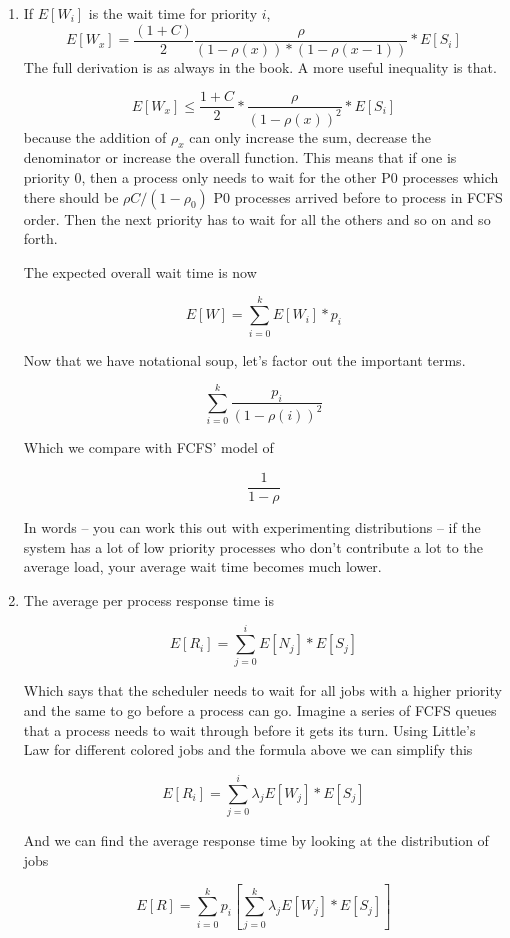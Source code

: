 \begin{enumerate}
\item If $E[W_i]$ is the wait time for priority $i$,
  \[
  E[W_x] = \frac{(1 + C)}{2}\frac{\rho}{(1 - \rho(x))*( 1 - \rho(x-1))} * E[S_i]
  \]
    The full derivation is as always in the book.
    A more useful inequality is that.

    \[
    E[W_x] \leq \frac{1 + C}{2}* \frac{\rho}{(1 - \rho(x))^2} * E[S_i]
    \]
    because the addition of $\rho_x$ can only increase the sum, decrease the denominator or increase the overall function.
  This means that if one is priority 0, then a process only needs to wait for the other P0 processes which there should be $\rho C/ (1 - \rho_0)$ P0 processes arrived before to process in FCFS order.
  Then the next priority has to wait for all the others and so on and so forth.

  The expected overall wait time is now

  \[
      E[W] = \sum\limits_{i=0}^k E[W_i] * p_i
  \]

  Now that we have notational soup, let's factor out the important terms.

  \[
      \sum\limits_{i=0}^k \frac{p_i}{(1-\rho(i))^2}
  \]

  Which we compare with FCFS' model of

  \[
      \frac{1}{1-\rho}
  \]

  In words -- you can work this out with experimenting distributions -- if the system has a lot of low priority processes who don't contribute a lot to the average load, your average wait time becomes much lower.

\item The average per process response time is

  \[
  E[R_i] = \sum\limits_{j = 0}^i E[N_j] * E[S_j]
  \]

  Which says that the scheduler needs to wait for all jobs with a higher priority and the same to go before a process can go.
  Imagine a series of FCFS queues that a process needs to wait through before it gets its turn.
  Using Little's Law for different colored jobs and the formula above we can simplify this

  \[
      E[R_i] = \sum\limits_{j=0}^i \lambda_j E[W_j] * E[S_j]
  \]

  And we can find the average response time by looking at the distribution of jobs

  \[
      E[R] = \sum\limits_{i=0}^k p_i [\sum\limits_{j=0}^k \lambda_j E[W_j] * E[S_j] ]
  \]


\end{enumerate}
